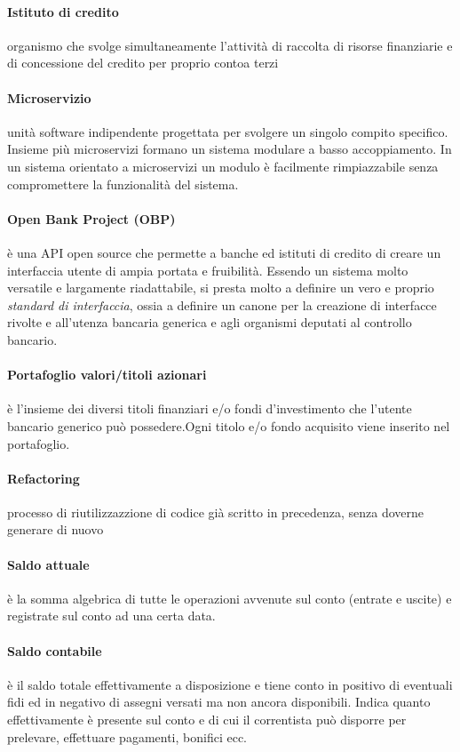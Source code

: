 \paragraph{Istituto di credito}
	organismo che svolge simultaneamente l’attività di raccolta di risorse finanziarie e di concessione del credito per proprio contoa terzi 
\paragraph{Microservizio}
unit\`a software indipendente progettata per svolgere un singolo compito specifico. Insieme pi\`u microservizi formano un sistema modulare a basso accoppiamento. In un sistema orientato a microservizi un modulo \`e facilmente rimpiazzabile senza compromettere la funzionalit\`a del sistema.

\paragraph{Open Bank Project (OBP)}
	è una API open source che permette a banche ed istituti di credito di creare un interfaccia utente di ampia portata e fruibilità. Essendo un sistema molto versatile e largamente riadattabile, si presta molto a definire un vero e proprio \emph{standard di interfaccia}, ossia a definire un canone per la creazione di interfacce rivolte e all'utenza bancaria generica e agli organismi deputati al controllo bancario. \cite{obp}
\paragraph{Portafoglio valori/titoli azionari}
	è l'insieme dei diversi titoli finanziari e/o fondi d'investimento che l'utente bancario generico può possedere.Ogni titolo e/o fondo acquisito viene inserito nel portafoglio.
\paragraph{Refactoring}
	processo di riutilizzazzione di codice già scritto in precedenza, senza doverne generare di nuovo
\paragraph{Saldo attuale} \label{glossario:saldo-attuale}
	\`e la somma algebrica di tutte le operazioni avvenute sul conto (entrate e uscite) e registrate sul conto ad una certa data.
\paragraph{Saldo contabile} \label{glossario:saldo-contabile}
	è il saldo totale effettivamente a disposizione e tiene conto in positivo di eventuali fidi ed in negativo di assegni versati ma non ancora disponibili.
	Indica quanto effettivamente \`e presente sul conto e di cui il correntista pu\`o disporre per prelevare, effettuare pagamenti, bonifici ecc.
